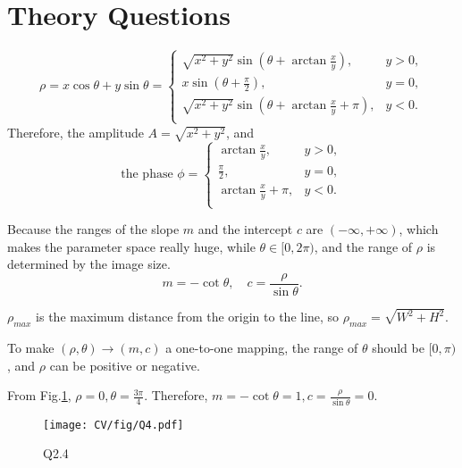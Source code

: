 \documentclass[
  course = {{16-720B Computer Vision}},
  quartile = {{1}},
  assignment = 1-Hough\ Transform,
  name = {{Kangle Deng}},
  email = {{kangled@andrew.cmu.edu}},
  firstexercise = 1
]{aga-homework}
\begin{document}
\section{Theory Questions}
\subexercise 
\begin{equation*}
\rho = x\cos{\theta}+y\sin{\theta} = 
\begin{cases}
\sqrt{x^2 + y^2} \sin{(\theta+\arctan\frac{x}{y})}, & y>0,\\
x \sin{(\theta+\frac{\pi}{2})},& y=0,\\
\sqrt{x^2 + y^2} \sin{(\theta+\arctan\frac{x}{y}+\pi)}, & y<0.\\
\end{cases}
\end{equation*}
Therefore, the amplitude $A = \sqrt{x^2 + y^2}$, and
\begin{equation*}
    \text{the phase } \phi = 
    \begin{cases}
\arctan\frac{x}{y}, & y>0,\\
\frac{\pi}{2},& y=0,\\
\arctan\frac{x}{y}+\pi, & y<0.\\
\end{cases}
\end{equation*}

\subexercise
Because the ranges of the slope $m$ and the intercept $c$ are  $(-\infty, +\infty)$, which makes the parameter space really huge, while $\theta \in [0, 2\pi)$, and the range of $\rho$ is determined by the image size.
\begin{equation*}
    m = -\cot{\theta}, \quad c = \frac{\rho}{\sin{\theta}}.
\end{equation*}

\subexercise
$\rho_{max}$ is the maximum distance from the origin to the line, so $\rho_{max} = \sqrt{W^2+H^2}$.

To make $(\rho, \theta) \rightarrow (m,c)$ a one-to-one mapping, the range of $\theta$ should be $[0, \pi)$, and $\rho$ can be positive or negative. 

\subexercise
From Fig.\ref{fig:Q2.4}, $\rho=0, \theta=\frac{3\pi}{4}$. Therefore, $m=-\cot{\theta}=1, c=\frac{\rho}{\sin{\theta}}=0$.

\begin{figure}[h]
    \centering
    \texttt{[image: CV/fig/Q4.pdf]}
    \caption{Q2.4}
    \label{fig:Q2.4}
\end{figure}
\end{document}

